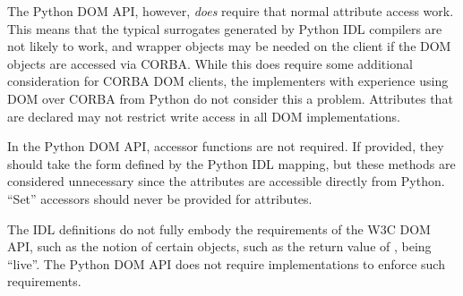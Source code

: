 The Python DOM API, however, \emph{does} require that normal attribute
access work.  This means that the typical surrogates generated by
Python IDL compilers are not likely to work, and wrapper objects may
be needed on the client if the DOM objects are accessed via CORBA.
While this does require some additional consideration for CORBA DOM
clients, the implementers with experience using DOM over CORBA from
Python do not consider this a problem.  Attributes that are declared
 may not restrict write access in all DOM
implementations.

In the Python DOM API, accessor functions are not required.  If provided,
they should take the form defined by the Python IDL mapping, but
these methods are considered unnecessary since the attributes are
accessible directly from Python.  ``Set'' accessors should never be
provided for  attributes.

The IDL definitions do not fully embody the requirements of the W3C DOM
API, such as the notion of certain objects, such as the return value of
, being ``live''.  The Python DOM API
does not require implementations to enforce such requirements.
